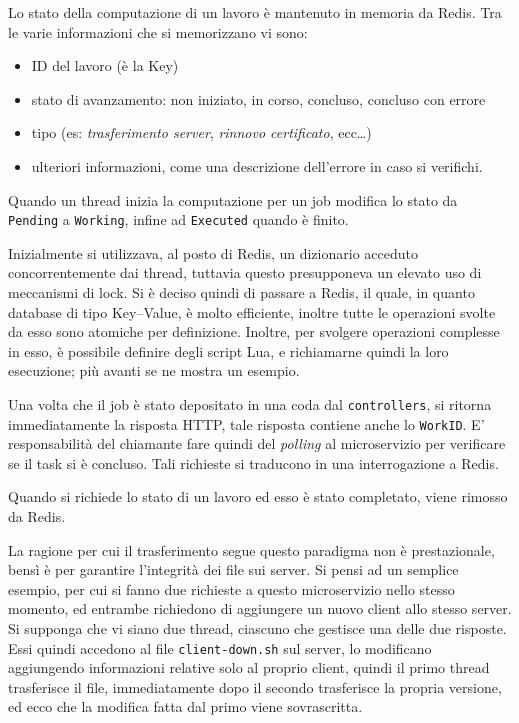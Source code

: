 Lo stato della computazione di un lavoro è mantenuto in memoria da Redis. Tra le varie informazioni
che si memorizzano vi sono:
\begin{itemize}
	\item ID del lavoro (è la Key)
	\item stato di avanzamento: non iniziato, in corso, concluso, concluso con errore
	\item tipo (es: \textit{trasferimento server}, \textit{rinnovo certificato}, ecc\ldots)
	\item ulteriori informazioni, come una descrizione dell'errore in caso si verifichi.
\end{itemize}

Quando un thread inizia la computazione per un job modifica lo stato da \texttt{Pending}
a \texttt{Working}, infine ad \texttt{Executed} quando è finito.

Inizialmente si utilizzava, al posto di Redis, un dizionario acceduto concorrentemente dai thread,
tuttavia questo presupponeva un elevato uso di meccanismi di lock. Si è deciso quindi di
passare a Redis, il quale, in quanto database di tipo Key--Value, è molto efficiente,
inoltre tutte le operazioni svolte da esso sono atomiche per definizione.
Inoltre, per svolgere operazioni complesse in esso, è possibile definire degli script Lua,
e richiamarne quindi la loro esecuzione; più avanti se ne mostra un esempio.

Una volta che il job è stato depositato in una coda dal \texttt{controllers}, si ritorna immediatamente
la risposta HTTP, tale risposta contiene anche lo \texttt{WorkID}. E' responsabilità
del chiamante fare quindi del \textit{polling} al microservizio per verificare se il task
si è concluso. Tali richieste si traducono in una interrogazione a Redis.

Quando si richiede lo stato di un lavoro ed esso è stato completato, viene rimosso da Redis.

La ragione per cui il trasferimento segue questo paradigma non è prestazionale, bensì è per
garantire l'integrità dei file sui server.
Si pensi ad un semplice esempio, per cui si fanno due richieste a questo microservizio nello stesso
momento, ed entrambe richiedono di aggiungere un nuovo client allo stesso server.
Si supponga che vi siano due thread, ciascuno che gestisce una delle due risposte. Essi quindi
accedono al file \texttt{client-down.sh} sul server, lo modificano aggiungendo informazioni
relative solo al proprio client, quindi il primo thread trasferisce il file, immediatamente dopo
il secondo trasferisce la propria versione, ed ecco che la modifica fatta dal primo viene
sovrascritta.

